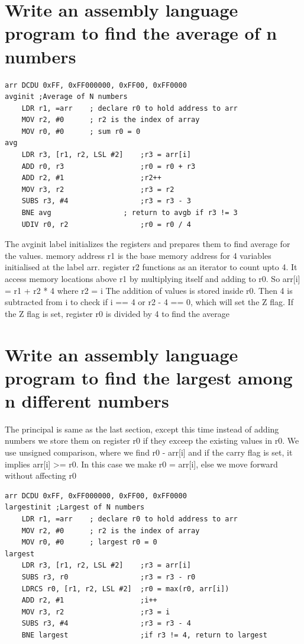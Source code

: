 \documentclass{article}
\begin{document}
\section{Write an assembly language program to find the average of n numbers}
    \begin{verbatim}
arr DCDU 0xFF, 0xFF000000, 0xFF00, 0xFF0000
avginit	;Average of N numbers
    LDR r1, =arr	; declare r0 to hold address to arr
    MOV r2, #0		; r2 is the index of array
    MOV r0, #0		; sum r0 = 0
avg
    LDR r3, [r1, r2, LSL #2]	;r3 = arr[i]
    ADD r0, r3					;r0 = r0 + r3
    ADD r2, #1					;r2++
    MOV r3, r2					;r3 = r2
    SUBS r3, #4					;r3 = r3 - 3
    BNE avg					; return to avgb if r3 != 3
    UDIV r0, r2					;r0 = r0 / 4
    \end{verbatim}
    The avginit label initializes the registers and prepares them to find average for the values. memory address r1 is the base memory address for 4 variables initialised at the label arr. register r2 functions as an iterator to count upto 4. It access memory locations above r1 by multiplying itself and adding to r0. 
    So arr[i] = r1 + r2 * 4 where r2 = i
    The addition of values is stored inside r0. Then 4 is subtracted from i to check if i == 4 or r2 - 4 == 0, which will set the Z flag. If the Z flag is set, register r0 is divided by 4 to find the average
\section{Write an assembly language program to find the largest among n
different numbers}
    The principal is same as the last section, except this time instead of adding numbers we store them on register r0 if they exceep the existing values in r0. We use unsigned comparison, where we find r0 - arr[i] and if the carry flag is set, it implies arr[i] >= r0. In this case we make r0 = arr[i], else we move forward without affecting r0
    \begin{verbatim}
arr DCDU 0xFF, 0xFF000000, 0xFF00, 0xFF0000
largestinit	;Largest of N numbers
    LDR r1, =arr	; declare r0 to hold address to arr
    MOV r2, #0		; r2 is the index of array
    MOV r0, #0		; largest r0 = 0
largest
    LDR r3, [r1, r2, LSL #2] 	;r3 = arr[i]
    SUBS r3, r0					;r3 = r3 - r0
    LDRCS r0, [r1, r2, LSL #2]	;r0 = max(r0, arr[i])
    ADD r2, #1					;i++
    MOV r3, r2					;r3 = i
    SUBS r3, #4					;r3 = r3 - 4
    BNE largest					;if r3 != 4, return to largest
    \end{verbatim}
\end{document}
